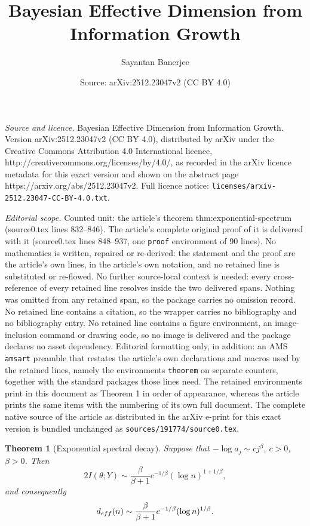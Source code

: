 \documentclass[10pt,a4paper]{amsart}
\title{Bayesian Effective Dimension from Information Growth}
\author{Sayantan Banerjee}
\date{Source: arXiv:2512.23047v2 (CC BY 4.0)}
\newtheorem{theorem}{Theorem}
\begin{document}
\maketitle

\noindent\emph{Source and licence.} Bayesian Effective Dimension from Information Growth. Version arXiv:2512.23047v2 (CC BY 4.0), distributed by arXiv under the Creative Commons Attribution 4.0 International licence, http://creativecommons.org/licenses/by/4.0/, as recorded in the arXiv licence metadata for this exact version and shown on the abstract page https://arxiv.org/abs/2512.23047v2. Full licence notice: \texttt{licenses/arxiv-2512.23047-CC-BY-4.0.txt}.\par\smallskip

\noindent\textit{Editorial scope.} Counted unit: the article's theorem thm:exponential-spectrum (source0.tex lines 832--846). The article's complete original proof of it is delivered with it (source0.tex lines 848--937, one \texttt{proof} environment of 90 lines). No mathematics is written, repaired or re-derived: the statement and the proof are the article's own lines, in the article's own notation, and no retained line is substituted or re-flowed.  No further source-local context is needed: every cross-reference of every retained line resolves inside the two delivered spans.  Nothing was omitted from any retained span, so the package carries no omission record.  No retained line contains a citation, so the wrapper carries no bibliography and no bibliography entry.  No retained line contains a figure environment, an image-inclusion command or drawing code, so no image is delivered and the package declares no asset dependency.  Editorial formatting only, in addition: an AMS \texttt{amsart} preamble that restates the article's own declarations and macros used by the retained lines, namely the environments \texttt{theorem} on separate counters, together with the standard packages those lines need.  The retained environments print in this document as Theorem 1 in order of appearance, whereas the article prints the same items with the numbering of its own full document.  The complete native source of the article as distributed in the arXiv e-print for this exact version is bundled unchanged as \texttt{sources/191774/source0.tex}.
\begin{theorem}[Exponential spectral decay]
	\label{thm:exponential-spectrum}
	Suppose that \(-\log a_j\sim cj^\beta\), \(c>0\), \(\beta>0\). Then
	\[
	2I(\theta;Y)
	\sim
	\frac{\beta}{\beta+1}c^{-1/\beta}(\log n)^{1+1/\beta},
	\]
	and consequently
	\[
	d_{\rm eff}(n)
	\sim
	\frac{\beta}{\beta+1}c^{-1/\beta}(\log n)^{1/\beta}.
	\]
\end{theorem}
\end{document}
